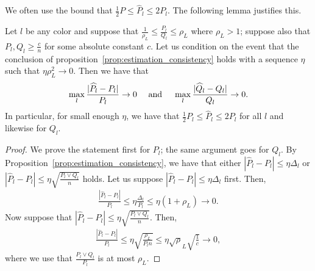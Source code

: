 \documentclass{article}
\begin{document}
We often use the bound that $\frac{1}{2} P \leq \hat{P}_l \leq 2 P_l$. The following lemma justifies this.
\begin{lemma}
\label{lem:bound_ratio_P_Pl}
Let $l$ be any color and suppose that $\frac{1}{\rho_L} \leq \frac{P_l}{Q_l} \leq \rho_L$ where $\rho_L > 1$; suppose also that $P_l, Q_l \geq \frac{c}{n}$ for some absolute constant $c$. Let us condition on the event that the 
conclusion of proposition~\ref{prop:estimation_consistency} holds with a sequence $\eta$ such that $\eta \rho_L^2 \rightarrow 0$. Then we have that
\[
\max_l \frac{|\widehat{P}_l - P_l|}{P_l} \rightarrow 0
\quad \textrm{ and } \quad
\max_l \frac{|\widehat{Q}_l - Q_l|}{Q_l} \rightarrow 0.
\]
In particular, for small enough $\eta$, we have that $\frac{1}{2} P_l \leq \hat{P}_l \leq 2P_l$ for all $l$ and likewise for $Q_l$.
\end{lemma}


\begin{proof}

We prove the statement first for $P_l$; the same argument goes for $Q_l$. By Proposition~\ref{prop:estimation_consistency}, we have that either $| \hat{P}_l - P_l | \leq \eta \Delta_l$ or $| \hat{P}_l - P_l | \leq \eta \sqrt{ \frac{P_l \vee Q_l}{n} }$ holds. Let us suppose $| \hat{P}_l - P_l | \leq \eta \Delta_l$ first. Then,
\begin{align*}
\frac{ | \hat{P}_l - P_l |}{P_l} \leq \eta \frac{\Delta_l}{P_l} \leq \eta (1+\rho_L) \rightarrow 0.
\end{align*}
Now suppose that $| \hat{P}_l - P_l | \leq \eta \sqrt{ \frac{P_l \vee Q_l}{n} }$. Then,
\begin{align*}
\frac{| \hat{P}_l - P_l |}{P_l} \leq \eta \sqrt{ \frac{\rho_L}{ P_l n}} \leq \eta \sqrt \rho_L \sqrt{ \frac{1}{c}} \rightarrow 0,
\end{align*}
where we use that $\frac{P_l \vee Q_l}{P_l}$ is at most $\rho_L$.
\end{proof}
\end{document}
